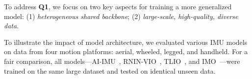 
To address \textbf{Q1}, we focus on two key aspects for training a more generalized model: (1) \textit{heterogeneous shared backbone}; (2) \textit{large-scale, high-quality, diverse data}.

To illustrate the impact of model architecture, we evaluated various IMU models on data from four motion platforms: aerial, wheeled, legged, and handheld. For a fair comparison, all models—AI-IMU~\cite{AI-IMU}, RNIN-VIO~\cite{rnin-vio}, TLIO~\cite{liu2020tlio}, and IMO~\cite{IMO}—were trained on the same large dataset and tested on identical unseen data.

